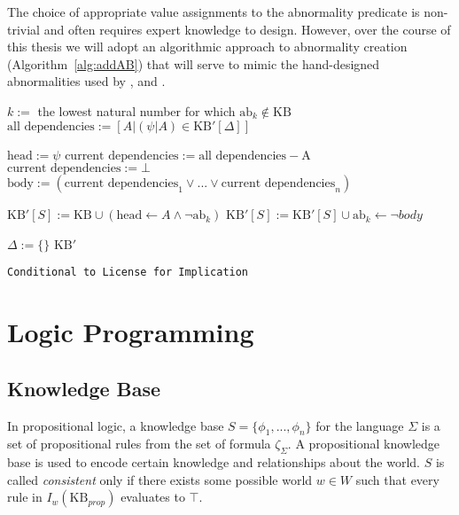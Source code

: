 The choice of appropriate value assignments to the abnormality predicate is non-trivial and often requires expert knowledge to design. However, over the course of this thesis we will adopt an algorithmic approach to abnormality creation (Algorithm~\ref{alg:addAB}) that will serve to mimic the hand-designed abnormalities used by \cite{dietz2012computational}, and \cite{breu2019weak}.


\begin{algorithm}[H] 
\SetAlgoLined
{}
{
{
$k:=$ the lowest natural number for which $\text{ab}_k \notin \text{KB}$\;
$\text{all dependencies}:= [A | (\psi|A) \in \text{KB}'[\Delta]]$\;

{
$\text{head}:=\psi$\;
$\text{current dependencies}:= \text{all dependencies} - \text{A}$\;
{
$\text{current dependencies}:=\bot$\;
}
$\text{body}:=(\text{current dependencies}_1 \lor ... \lor \text{current dependencies}_n)$\;

$\text{KB}'[S]:= \text{KB} \cup (\text{head} \leftarrow A \land \lnot \text{ab}_k)$\;
$\text{KB}'[S]:= \text{KB}'[S] \cup \text{ab}_k \leftarrow \lnot body$\;

}
}
$\Delta:=\{\}$\;
\Return $\text{KB}'$
}
\caption{\texttt{Conditional to License for Implication}}
\label{alg:addAB}
\end{algorithm}







\section{Logic Programming}
\subsection{Knowledge Base} \label{ssec:kb}
In propositional logic, a knowledge base $S=\{\phi_1,...,\phi_n\}$ for the language $\Sigma$ is a set of propositional rules from the set of formula $\zeta_\Sigma$. A propositional knowledge base is used to encode certain knowledge and relationships about the world. $S$ is called \textit{consistent} only if there exists some possible world $w \in W$ such that every rule in $I_w(\text{KB}_{prop})$ evaluates to $\top$.

